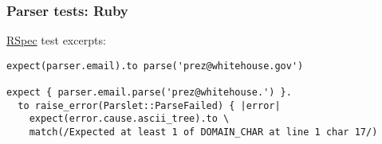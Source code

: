 \begin{frame}[fragile]
  \frametitle{Parser tests: Ruby}

  \href{http://rspec.info/}{RSpec} test excerpts:

  \begin{verbatim}
expect(parser.email).to parse('prez@whitehouse.gov')

expect { parser.email.parse('prez@whitehouse.') }.
  to raise_error(Parslet::ParseFailed) { |error|
    expect(error.cause.ascii_tree).to \
    match(/Expected at least 1 of DOMAIN_CHAR at line 1 char 17/)
  \end{verbatim}
\end{frame}
